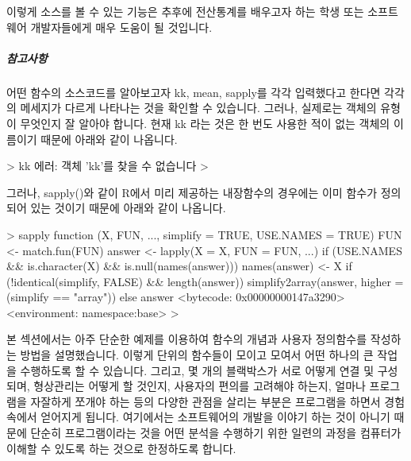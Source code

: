 이렇게 소스를 볼 수 있는 기능은 추후에 전산통계를 배우고자 하는 학생 또는 소프트웨어 개발자들에게 매우 도움이 될 것입니다. 

\subparagraph{참고사항}
어떤 함수의 소스코드를 알아보고자 kk, mean, sapply를 각각 입력했다고 한다면 각각의 메세지가 다르게 나타나는 것을 확인할 수 있습니다.
그러나, 실제로는 객체의 유형이 무엇인지 잘 알아야 합니다. 
현재 kk 라는 것은 한 번도 사용한 적이 없는 객체의 이름이기 때문에 아래와 같이 나옵니다. 

\begin{Schunk}
\begin{Soutput}
> kk
에러: 객체 'kk'를 찾을 수 없습니다
>
\end{Soutput}
\end{Schunk}

그러나, sapply()와 같이 R에서 미리 제공하는 내장함수의 경우에는 이미 함수가 정의되어 있는 것이기 때문에 아래와 같이 나옵니다. 


\begin{Schunk}
\begin{Soutput}
> sapply
function (X, FUN, ..., simplify = TRUE, USE.NAMES = TRUE) 
{
   FUN <- match.fun(FUN)
   answer <- lapply(X = X, FUN = FUN, ...)
   if (USE.NAMES && is.character(X) && is.null(names(answer))) 
       names(answer) <- X
   if (!identical(simplify, FALSE) && length(answer)) 
       simplify2array(answer, higher = (simplify == "array"))
   else answer
}
<bytecode: 0x00000000147a3290>
<environment: namespace:base>
>
\end{Soutput}
\end{Schunk}



본 섹션에서는 아주 단순한 예제를 이용하여 함수의 개념과 사용자 정의함수를 작성하는 방법을 설명했습니다.  
이렇게 단위의 함수들이 모이고 모여서 어떤 하나의 큰 작업을 수행하도록 할 수 있습니다. 
그리고, 몇 개의 블랙박스가 서로 어떻게 연결 및  구성되며, 형상관리는 어떻게 할 것인지, 사용자의 편의를 고려해야 하는지, 얼마나 프로그램을 자잘하게 쪼개야 하는 등의 다양한 관점을 살리는 부분은 프로그램을 하면서 경험속에서 얻어지게 됩니다.
여기에서는 소프트웨어의 개발을 이야기 하는 것이 아니기 때문에 단순히 프로그램이라는 것을 어떤 분석을 수행하기 위한 일련의 과정을 컴퓨터가 이해할 수 있도록 하는 것으로 한정하도록 합니다.



